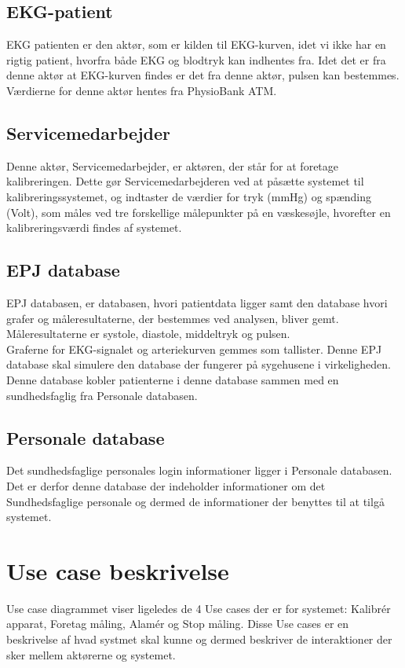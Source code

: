 \subsection{EKG-patient}
EKG patienten er den aktør, som er kilden til EKG-kurven, idet vi ikke har en rigtig patient, hvorfra både EKG og blodtryk kan indhentes fra. Idet det er fra denne aktør at EKG-kurven findes er det fra denne aktør, pulsen kan bestemmes.\\
Værdierne for denne aktør hentes fra PhysioBank ATM.
\subsection{Servicemedarbejder}
Denne aktør, Servicemedarbejder, er aktøren, der står for at foretage kalibreringen. Dette gør Servicemedarbejderen ved at påsætte systemet til kalibreringssystemet, og indtaster de værdier for tryk (mmHg) og spænding (Volt), som måles ved tre forskellige målepunkter på en væskesøjle, hvorefter en kalibreringsværdi findes af systemet.
\subsection{EPJ database}
EPJ databasen, er databasen, hvori patientdata ligger samt den database hvori grafer og måleresultaterne, der bestemmes ved analysen, bliver gemt. Måleresultaterne er systole, diastole, middeltryk og pulsen.\\
Graferne for EKG-signalet og arteriekurven gemmes som tallister. Denne EPJ database skal simulere den database der fungerer på sygehusene i virkeligheden. Denne database kobler patienterne i denne database sammen med en sundhedsfaglig fra Personale databasen.
\subsection{Personale database}
Det sundhedsfaglige personales login informationer ligger i Personale databasen. Det er derfor denne database der indeholder informationer om det Sundhedsfaglige personale og dermed de informationer der benyttes til at tilgå systemet.
\section{Use case beskrivelse}
Use case diagrammet viser ligeledes de 4 Use cases der er for systemet: Kalibrér apparat, Foretag måling, Alamér og Stop måling. Disse Use cases er en beskrivelse af hvad systmet skal kunne og dermed beskriver de interaktioner der sker mellem aktørerne og systemet.
\\
